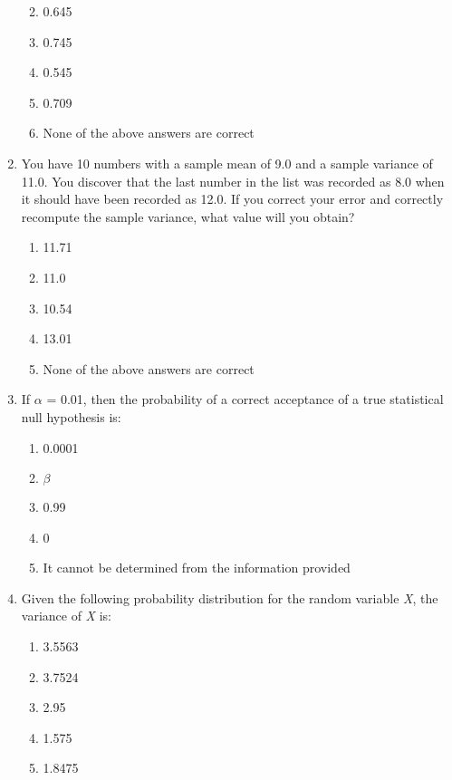 \documentclass[]{article}
\begin{document}
\begin{enumerate}
  \begin{enumerate}
  \def\labelenumii{\alph{enumii}.}
  \item
    0.645
  \item
    0.745
  \item
    0.545
  \item
    0.709
  \item
    None of the above answers are correct
  \end{enumerate}
\item
  You have 10 numbers with a sample mean of 9.0 and a sample variance of
  11.0. You discover that the last number in the list was recorded as
  8.0 when it should have been recorded as 12.0. If you correct your
  error and correctly recompute the sample variance, what value will you
  obtain?

  \begin{enumerate}
  \def\labelenumii{\alph{enumii}.}
  \item
    11.71
  \item
    11.0
  \item
    10.54
  \item
    13.01
  \item
    None of the above answers are correct
  \end{enumerate}
\item
  If \(\alpha\) = 0.01, then the probability of a correct acceptance of
  a true statistical null hypothesis is:

  \begin{enumerate}
  \def\labelenumii{\alph{enumii}.}
  \item
    0.0001
  \item
    \(\beta\)
  \item
    0.99
  \item
    0
  \item
    It cannot be determined from the information provided
  \end{enumerate}
\item
  Given the following probability distribution for the random variable
  \emph{X}, the variance of \emph{X} is:

  \begin{enumerate}
  \def\labelenumii{\alph{enumii}.}
  \item
    3.5563
  \item
    3.7524
  \item
    2.95
  \item
    1.575
  \item
    1.8475
  \end{enumerate}
\end{enumerate}
\end{document}

